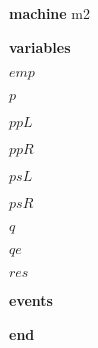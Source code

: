 \begin{block}
  \item   \textbf{machine} m2
  \item   \textbf{variables}
  \begin{block}
    \item   $emp$
    \item   $p$
    \item   $ppL$
    \item   $ppR$
    \item   $psL$
    \item   $psR$
    \item   $q$
    \item   $qe$
    \item   $res$
  \end{block}
  \item   \textbf{events}
  \begin{block}
    \item   
    \item   
    \item   
    \item   
    \item   
    \item   
    \item   
    \item   
    \item   
    \item   
  \end{block}
  \item   \textbf{end} \\
\end{block}
